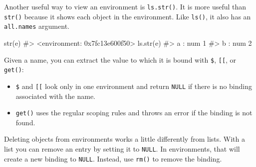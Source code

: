 \documentclass[oneside]{book}
\newenvironment{Shaded}{}{}
\newcommand{\KeywordTok} [1]{\textcolor[rgb]{0.00,0.44,0.13}{{#1}}}
\newcommand{\DataTypeTok}[1]{\textcolor[rgb]{0.56,0.13,0.00}{{#1}}}
\newcommand{\DecValTok}  [1]{\textcolor[rgb]{0.25,0.63,0.44}{{#1}}}
\newcommand{\StringTok}  [1]{\textcolor[rgb]{0.25,0.44,0.63}{{#1}}}
\newcommand{\CommentTok} [1]{\textcolor[rgb]{0.38,0.63,0.69}{{#1}}}
\newcommand{\OtherTok}   [1]{\textcolor[rgb]{0.00,0.44,0.13}{{#1}}}
\newcommand{\NormalTok}  [1]{{#1}}
\begin{document}
Another useful way to view an environment is \texttt{ls.str()}. It is
more useful than \texttt{str()} because it shows each object in the
environment. Like \texttt{ls()}, it also has an \texttt{all.names}
argument.

\begin{Shaded}
\begin{Highlighting}[]
\KeywordTok{str}\NormalTok{(e)}
\CommentTok{#> <environment: 0x7fc13e600f50>}
\KeywordTok{ls.str}\NormalTok{(e)}
\CommentTok{#> a :  num 1}
\CommentTok{#> b :  num 2}
\end{Highlighting}
\end{Shaded}

Given a name, you can extract the value to which it is bound with
\texttt{\$}, \texttt{{[}{[}}, or \texttt{get()}:

\begin{itemize}
\item
  \texttt{\$} and \texttt{{[}{[}} look only in one environment and
  return \texttt{NULL} if there is no binding associated with the name.
\item
  \texttt{get()} uses the regular scoping rules and throws an error if
  the binding is not found.
\end{itemize}

\begin{Shaded}
\end{Shaded}

Deleting objects from environments works a little differently from
lists. With a list you can remove an entry by setting it to
\texttt{NULL}. In environments, that will create a new binding to
\texttt{NULL}. Instead, use \texttt{rm()} to remove the binding.

\begin{Shaded}
\end{Shaded}
\end{document}

